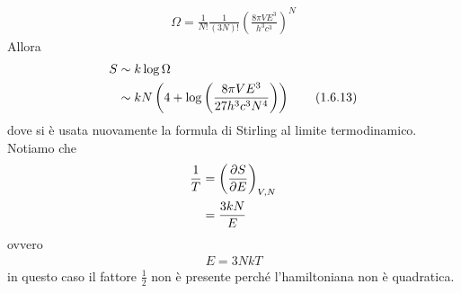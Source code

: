 \documentclass{article}
\begin{document}
\begin{align}
    \Omega = \frac{1}{N!}\frac{1}{(3N)!}\left(\frac{8\pi V E^3}{h^3c^3}\right)^N \tag{1.6.12}
\end{align}
Allora
\begin{align}
    S &\sim k\log \Omega \notag \\
    &\sim kN\left(4 + \log\left(\frac{8\pi VE^3}{27h^3c^3N^4}\right)\right) \tag{1.6.13}
\end{align}
dove si è usata nuovamente la formula di Stirling al limite termodinamico. Notiamo che
\begin{align}
    \frac{1}{T} &= \left(\frac{\partial S}{\partial E}\right)_{V, N} \notag \\
    &= \frac{3kN}{E} \notag
\end{align}
ovvero
\begin{align}
    E = 3NkT \tag{1.6.14}
\end{align}
in questo caso il fattore $\frac{1}{2}$ non è presente perché l'hamiltoniana non è quadratica.


\newpage
\end{document}
